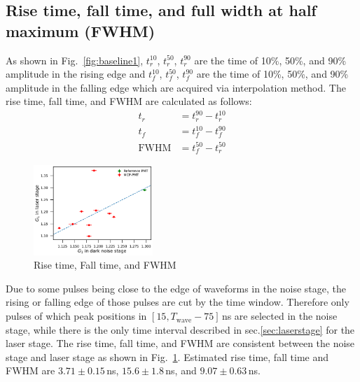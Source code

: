 \subsection{Rise time, fall time, and full width at half maximum (FWHM)}
As shown in Fig.~\ref{fig:baseline1}, $t^{10}_r$, $t^{50}_r$, $t^{90}_r$ are the time of 10\%, 50\%, and 90\% amplitude in the rising edge and $t^{10}_f$, $t^{50}_f$, $t^{90}_f$ are the time of 10\%, 50\%, and 90\% amplitude in the falling edge which are acquired via interpolation method. The rise time, fall time, and FWHM are calculated as follows:
\begin{align}
    t_r &= t^{90}_r - t^{10}_r\\
    t_f &= t^{10}_f - t^{90}_f\\
    \mathrm{FWHM} &= t^{50}_f - t^{50}_r
\end{align}
\begin{figure}[!htbp]
    \centering
    \includegraphics[width=0.4\textwidth,page=7]{figures/result/compare.pdf}
    \caption{Rise time, Fall time, and FWHM}
    \label{fig:RiseCompare}
\end{figure}
Due to some pulses being close to the edge of waveforms in the noise stage, the rising or falling edge of those pulses are cut by the time window. Therefore only pulses of which peak positions in $[15, T_{\mathrm{wave}}-75]$\,ns are selected in the noise stage, while there is the only time interval described in sec.\ref{sec:laserstage} for the laser stage.
 The rise time, fall time, and FWHM are consistent between the noise stage and laser stage as shown in Fig.~\ref{fig:RiseCompare}. Estimated rise time, fall time and FWHM are $3.71\pm0.15$\,ns, $15.6\pm1.8$\,ns, and $9.07\pm0.63$\,ns.

